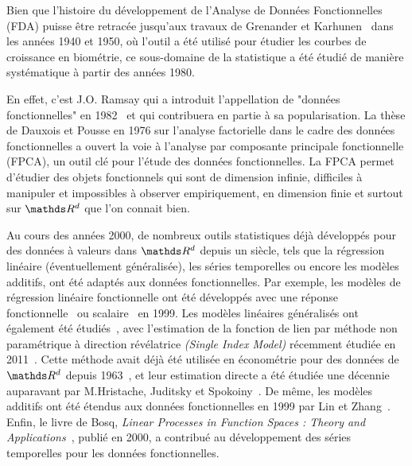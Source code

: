 

Bien que l'histoire du développement de l'Analyse de Données Fonctionnelles (FDA) puisse être retracée jusqu'aux travaux de Grenander et Karhunen~\cite{karhunen1946spektraltheorie} dans les années 1940 et 1950, où l'outil a été utilisé pour étudier les courbes de croissance en biométrie, ce sous-domaine de la statistique a été étudié de manière systématique à partir des années 1980.

\bigskip

En effet, c'est J.O. Ramsay qui a introduit l'appellation de "données fonctionnelles" en 1982~\cite{ramsay1982data} et qui contribuera en partie à sa popularisation. La thèse de Dauxois et Pousse en 1976 sur l'analyse factorielle dans le cadre des données fonctionnelles\cite{dauxois1976analyses} a ouvert la voie à l'analyse par composante principale fonctionnelle (FPCA), un outil clé pour l'étude des données fonctionnelles. La FPCA permet d'étudier des objets fonctionnels qui sont de dimension infinie, difficiles à manipuler et impossibles à observer empiriquement, en dimension finie et surtout sur $\R d$ que l'on connait bien.

\bigskip

Au cours des années 2000, de nombreux outils statistiques déjà développés pour des données à valeurs dans $\R d$ depuis un siècle, tels que la régression linéaire (éventuellement généralisée), les séries temporelles ou encore les modèles additifs, ont été adaptés aux données fonctionnelles.
Par exemple, les modèles de régression linéaire fonctionnelle ont été développés avec une réponse fonctionnelle~\cite{ramsay1991some} ou scalaire~\cite{cardot1999functional} en 1999.
Les modèles linéaires généralisés ont également été étudiés~\cite{james2002generalized,muller2005generalized}, avec l'estimation de la fonction de lien par méthode non paramétrique à direction révélatrice \emph{(Single Index Model)} récemment étudiée en 2011~\cite{chen2011single}.
Cette méthode avait déjà été utilisée en économétrie pour des données de $\R d$ depuis 1963~\cite{sharpe1963simplified}, et leur estimation directe a été étudiée une décennie auparavant par M.Hristache, Juditsky et Spokoiny~\cite{hristache2001direct}. De même, les modèles additifs ont été étendus aux données fonctionnelles en 1999 par Lin et Zhang~\cite{lin1999inference}.
Enfin, le livre de Bosq, \emph{\textcolor{flatuicolors_blue_devil}{Linear Processes in Function Spaces : Theory and Applications}}~\cite{bosq2000linear}, publié en 2000, a contribué au développement des séries temporelles pour les données fonctionnelles.

